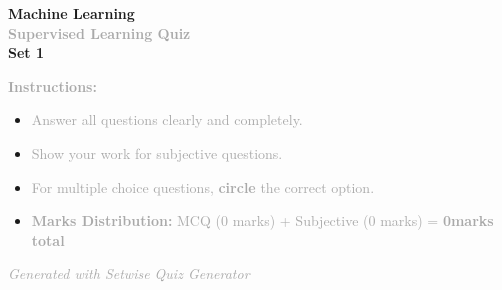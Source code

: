 \documentclass[11pt]{article}
\begin{document}
\begin{center}
  {\Huge\textcolor{primaryblue}{\textbf{Machine Learning}}} \\[5pt]
  {\LARGE\textcolor{darkgray}{\textbf{Supervised Learning Quiz}}} \\[3pt]
  {\Large\textcolor{secondaryblue}{\textbf{Set 1}}}
\end{center}

\vspace{20pt}

\begin{instructionbox}
\textcolor{darkgray}{\textbf{\large Instructions:}}
\begin{itemize}[leftmargin=20pt, itemsep=3pt]
  \item \textcolor{darkgray}{Answer all questions clearly and completely.}
  \item \textcolor{darkgray}{Show your work for subjective questions.}
  \item \textcolor{darkgray}{For multiple choice questions, \textbf{circle} the correct option.}
  \item \textcolor{darkgray}{\textbf{Marks Distribution:} MCQ (0 marks) + Subjective (0 marks) = \textbf{0marks total}}
\end{itemize}
\end{instructionbox}

\vspace{15pt}





\vfill
\begin{center}
  \textcolor{darkgray}{\small\textit{Generated with Setwise Quiz Generator}}
\end{center}
\end{document}
